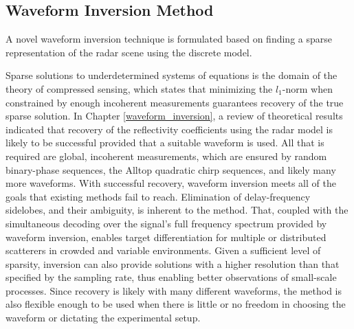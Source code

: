 \subsection{Waveform Inversion Method}
\begin{italicquote}
 A novel waveform inversion technique is formulated based on finding a sparse representation of the radar scene using the discrete model.
\end{italicquote}

Sparse solutions to underdetermined systems of equations is the domain of the theory of compressed sensing, which states that minimizing the $l_1$-norm when constrained by enough incoherent measurements guarantees recovery of the true sparse solution. In Chapter \ref{waveform_inversion}, a review of theoretical results indicated that recovery of the reflectivity coefficients using the radar model is likely to be successful provided that a suitable waveform is used. All that is required are global, incoherent measurements, which are ensured by random binary-phase sequences, the Alltop quadratic chirp sequences, and likely many more waveforms. With successful recovery, waveform inversion meets all of the goals that existing methods fail to reach. Elimination of delay-frequency sidelobes, and their ambiguity, is inherent to the method. That, coupled with the simultaneous decoding over the signal's full frequency spectrum provided by waveform inversion, enables target differentiation for multiple or distributed scatterers in crowded and variable environments. Given a sufficient level of sparsity, inversion can also provide solutions with a higher resolution than that specified by the sampling rate, thus enabling better observations of small-scale processes. Since recovery is likely with many different waveforms, the method is also flexible enough to be used when there is little or no freedom in choosing the waveform or dictating the experimental setup.

